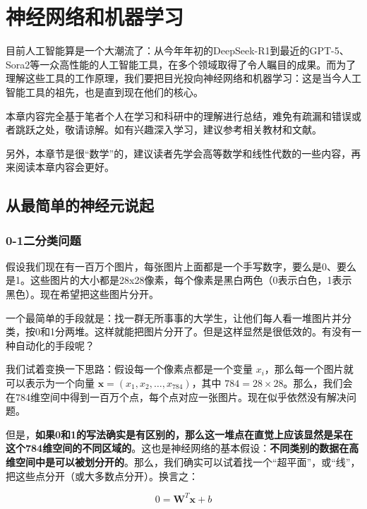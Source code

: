 \chapter{神经网络和机器学习}\label{chap:nn}

目前人工智能算是一个大潮流了：从今年年初的DeepSeek-R1到最近的GPT-5、Sora2等一众高性能的人工智能工具，在多个领域取得了令人瞩目的成果。而为了理解这些工具的工作原理，我们要把目光投向神经网络和机器学习：这是当今人工智能工具的祖先，也是直到现在他们的核心。

\begin{note}
    本章内容完全基于笔者个人在学习和科研中的理解进行总结，难免有疏漏和错误或者跳跃之处，敬请谅解。如有兴趣深入学习，建议参考相关教材和文献。

    另外，本章节是很“数学”的，建议读者先学会高等数学和线性代数的一些内容，再来阅读本章内容会更好。
\end{note}

\section{从最简单的神经元说起}

\subsection{0-1二分类问题}

假设我们现在有一百万个图片，每张图片上面都是一个手写数字，要么是0、要么是1。这些图片的大小都是28x28像素，每个像素是黑白两色（0表示白色，1表示黑色）。现在希望把这些图片分开。

一个最简单的手段就是：找一群无所事事的大学生，让他们每人看一堆图片并分类，按0和1分两堆。这样就能把图片分开了。但是这样显然是很低效的。有没有一种自动化的手段呢？

我们试着变换一下思路：假设每一个像素点都是一个变量 $x_i$，那么每一个图片就可以表示为一个向量 $\mathbf{x}=(x_1, x_2, \ldots, x_{784})$，其中 $784=28\times 28$。那么，我们会在784维空间中得到一百万个点，每个点对应一张图片。现在似乎依然没有解决问题。

但是，\textbf{如果0和1的写法确实是有区别的，那么这一堆点在直觉上应该显然是呆在这个784维空间的不同区域的}。这也是神经网络的基本假设：\textbf{不同类别的数据在高维空间中是可以被划分开的}。那么，我们确实可以试着找一个“超平面”，或“线”，把这些点分开（或大多数点分开）。换言之：

\[ 0 = \mathbf{W}^T \mathbf{x} + b \]

